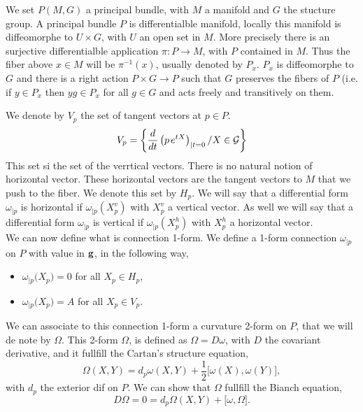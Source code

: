 \documentclass[a4paper,11pt]{article} %
\numberwithin{equation}{section} %
\numberwithin{figure}{section} %
\theoremstyle{plain} %
\theoremstyle{definition} %
\theoremstyle{remark} %
\begin{document}
\noindent
We set $P(M,G)$ a principal bundle, with $M$ a manifold and $G$ the stucture group. A principal bundle $P$ is differentialble manifold, locally this manifold is diffeomorphe to $U \times G$, with $U$ an open set in $M$. More precisely there is an surjective differentialble application $\pi : P \rightarrow M$, with $P$ contained in $M$. Thus the fiber above $x \in M$ will be $\pi^{-1}(x)$, usually denoted by $P_x$. $P_x$ is diffeomorphe to $G$ and there is a right action $P \times G \rightarrow P$ such that $G$ preserves the fibers of $P$ (i.e. if $y \in P_x$ then $yg \in P_x$ for all $g \in G$ and acts freely and transitively on them.

\begin{center}
\end{center}

\noindent
We denote by $V_p$ the set of tangent vectors at $p \in P$.
\begin{equation*}
 V_{p} = \left \{  \frac{d}{dt} \left( p\hspace{0.5mm} e^{tX} \right)_{|t=0} / X \in \cal{G}  \right \}
\end{equation*}
This set si the set of the verrtical vectors. There is no natural notion of horizontal vector. These horizontal vectors are the tangent vectors to $M$ that we push to the fiber. We denote this set by $H_p$. We will say that a differential form $\omega_{|p}$ is horizontal if $\omega_{|p}(X^{v}_{p})$ with $X^{v}_{p}$ a vertical vector. As well we will say that a differential form $\omega_{|p}$ is vertical if $\omega_{|p}(X^{h}_{p})$ with $X^{h}_{p}$ a horizontal vector. \\
We can now define what is connection 1-form. We define a 1-form connection $\omega_{|p}$ on $P$ with value in $\bf{g}$, in the following way,
\begin{itemize}
 \item $\omega_{|p}\big(X_{p}\big)=0$ for all $X_{p} \in H_p$,
 \item $\omega_{|p}\big(X_{p}\big)=A$ for all $X_{p} \in V_p$.
\end{itemize}
We can associate to this connection 1-form a curvature 2-form on $P$, that we will de note by $\Omega$. This 2-form $\Omega$, is defined as $\Omega = D \omega$, with $D$ the covariant derivative, and it fullfill the Cartan's structure equation,
\begin{equation*}
 \Omega(X,Y) = d_p \omega(X,Y) + \frac{1}{2} \bigg[ \omega(X) , \omega(Y) \bigg],
\end{equation*}
with $d_p$ the exterior dif on $P$. We can show that $\Omega$ fullfill the Bianch equation,
\begin{equation*}
 D\Omega = 0 = d_p \Omega(X,Y) + \bigg[ \omega , \Omega \bigg].
\end{equation*}
\end{document}
